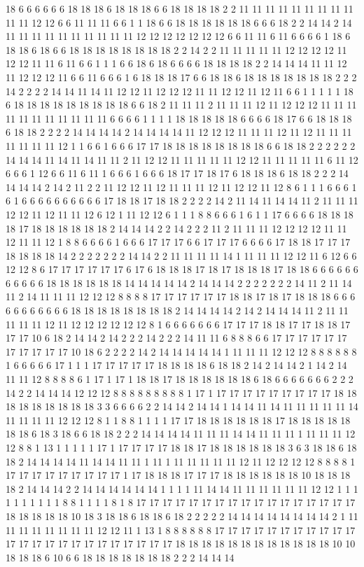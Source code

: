 18 6 6 6 6 6 6 18 18 18 6 18 18 18 6 6 18 18 18 18 2 2 11 11 11 11 11 11 11 11 11 11 11 12 12 6 6 11 11 11 6 6 1 1 18 6 6 18 18 18 18 18 18 6 6 6 18 2 2 14 14 2 14 11 11 11 11 11 11 11 11 11 11 12 12 12 12 12 12 12 6 6 11 11 6 11 6 6 6 6 1 18 6 18 18 6 18 6 6 18 18 18 18 18 18 18 18 2 2 14 2 2 11 11 11 11 11 12 12 12 12 11 12 12 11 11 6 11 6 6 1 1 1 6 6 18 6 18 6 6 6 6 18 18 18 18 2 2 14 14 14 11 11 12 11 12 12 12 11 6 6 11 6 6 6 1 6 18 18 18 17 6 6 18 18 6 18 18 18 18 18 18 18 2 2 2 14 2 2 2 2 14 14 11 14 11 12 12 11 12 12 12 11 11 12 12 11 12 11 6 6 1 1 1 1 1 18 6 18 18 18 18 18 18 18 18 18 6 6 18 2 11 11 11 2 11 11 11 12 11 12 12 12 11 11 11 11 11 11 11 11 11 11 11 6 6 6 6 1 1 1 1 18 18 18 18 18 6 6 6 6 18 17 6 6 18 18 18 6 18 18 2 2 2 2 14 14 14 14 2 14 14 14 14 11 12 12 12 11 11 11 12 11 12 11 11 11 11 11 11 11 12 1 1 6 6 1 6 6 6 17 17 18 18 18 18 18 18 18 18 6 6 18 18 2 2 2 2 2 2 14 14 14 11 14 11 14 11 11 2 11 12 12 11 11 11 11 11 12 12 11 11 11 11 11 6 11 12 6 6 6 1 12 6 6 11 6 11 1 6 6 6 1 6 6 6 18 17 17 18 17 6 18 18 18 6 18 18 2 2 2 14 14 14 14 2 14 2 11 2 2 11 12 12 11 12 11 11 11 12 11 12 12 11 12 8 6 1 1 1 6 6 6 1 6 1 6 6 6 6 6 6 6 6 6 6 17 18 18 17 18 18 2 2 2 2 14 2 11 14 11 14 14 11 2 11 11 11 12 12 11 12 11 11 12 6 12 1 11 12 12 6 1 1 1 8 8 6 6 6 1 6 1 1 17 6 6 6 6 18 18 18 18 17 18 18 18 18 18 18 2 14 14 14 2 2 14 2 2 2 11 2 11 11 11 12 12 12 12 11 11 12 11 11 12 1 8 8 6 6 6 6 1 6 6 6 17 17 17 6 6 17 17 17 6 6 6 6 17 18 18 17 17 17 18 18 18 18 14 2 2 2 2 2 2 2 14 14 2 2 11 11 11 11 14 1 11 11 11 12 12 11 6 12 6 6 12 12 8 6 17 17 17 17 17 17 6 17 6 18 18 18 17 18 17 18 18 18 17 18 18 6 6 6 6 6 6 6 6 6 6 6 18 18 18 18 18 18 14 14 14 14 14 2 14 14 14 2 2 2 2 2 2 2 14 11 2 11 14 11 2 14 11 11 11 12 12 12 8 8 8 8 17 17 17 17 17 17 18 18 17 18 17 18 18 18 6 6 6 6 6 6 6 6 6 6 6 18 18 18 18 18 18 18 18 2 14 14 14 14 2 14 2 14 14 14 11 2 11 11 11 11 11 12 11 12 12 12 12 12 12 8 1 6 6 6 6 6 6 6 17 17 17 18 18 17 17 18 18 17 17 17 10 6 18 2 14 14 2 14 2 2 2 14 2 2 2 14 11 11 6 8 8 8 6 6 17 17 17 17 17 17 17 17 17 17 17 10 18 6 2 2 2 2 14 2 14 14 14 14 14 1 11 11 11 12 12 12 8 8 8 8 8 8 1 6 6 6 6 6 17 1 1 1 17 17 17 17 17 18 18 18 18 6 18 18 2 14 2 14 14 2 1 14 2 14 11 11 12 8 8 8 8 6 1 17 1 17 1 18 18 17 18 18 18 18 18 18 6 18 6 6 6 6 6 6 6 2 2 2 14 2 2 14 14 14 12 12 12 8 8 8 8 8 8 8 8 8 1 17 1 17 17 17 17 17 17 17 17 17 18 18 18 18 18 18 18 18 18 3 3 6 6 6 6 2 2 14 14 2 14 14 1 14 14 11 14 11 11 11 11 11 14 11 11 11 11 12 12 12 8 1 1 8 8 1 1 1 1 17 17 18 18 18 18 18 18 17 18 18 18 18 18 18 18 6 18 3 18 6 6 18 18 2 2 2 14 14 14 14 11 11 11 14 14 11 11 11 1 11 11 11 12 12 8 8 1 13 1 1 1 1 1 17 1 17 17 17 17 18 18 17 18 18 18 18 18 18 3 6 3 18 18 6 18 18 2 14 14 14 14 11 14 14 11 11 1 11 1 11 11 11 11 11 12 11 12 12 12 12 8 8 8 8 1 17 17 17 17 17 17 17 17 17 1 17 18 18 18 17 17 17 18 18 18 18 18 18 10 18 18 18 18 2 14 14 14 2 2 14 14 14 14 14 14 1 1 1 1 11 14 14 11 11 11 11 11 11 12 12 1 1 1 1 1 1 1 1 1 1 8 8 1 1 1 1 8 1 8 17 17 17 17 17 17 17 17 17 17 17 17 17 17 17 17 17 18 18 18 18 18 10 18 3 18 18 6 18 18 6 18 2 2 2 2 2 14 14 14 14 14 14 14 14 2 1 11 11 11 11 11 11 11 11 12 12 11 1 13 1 8 8 8 8 8 8 17 17 17 17 17 17 17 17 17 17 17 17 17 17 17 17 17 17 17 17 17 17 17 17 18 18 18 18 18 18 18 18 18 18 18 18 10 10 18 18 18 6 10 6 6 18 18 18 18 18 18 18 2 2 2 14 14 14 